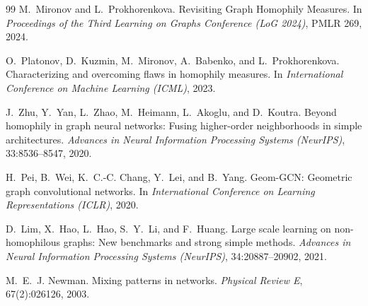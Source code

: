 \documentclass[11pt,a4paper]{article}
\begin{document}
\begin{thebibliography}{99}
M.~Mironov and L.~Prokhorenkova.
\newblock Revisiting Graph Homophily Measures.
\newblock In \emph{Proceedings of the Third Learning on Graphs Conference (LoG 2024)}, PMLR 269, 2024.

O.~Platonov, D.~Kuzmin, M.~Mironov, A.~Babenko, and L.~Prokhorenkova.
\newblock Characterizing and overcoming flaws in homophily measures.
\newblock In \emph{International Conference on Machine Learning (ICML)}, 2023.

J.~Zhu, Y.~Yan, L.~Zhao, M.~Heimann, L.~Akoglu, and D.~Koutra.
\newblock Beyond homophily in graph neural networks: Fusing higher-order neighborhoods in simple architectures.
\newblock \emph{Advances in Neural Information Processing Systems (NeurIPS)}, 33:8536--8547, 2020.

H.~Pei, B.~Wei, K.~C.-C. Chang, Y.~Lei, and B.~Yang.
\newblock Geom-GCN: Geometric graph convolutional networks.
\newblock In \emph{International Conference on Learning Representations (ICLR)}, 2020.

D.~Lim, X.~Hao, L.~Hao, S.~Y.~Li, and F.~Huang.
\newblock Large scale learning on non-homophilous graphs: New benchmarks and strong simple methods.
\newblock \emph{Advances in Neural Information Processing Systems (NeurIPS)}, 34:20887--20902, 2021.

M.~E.~J. Newman.
\newblock Mixing patterns in networks.
\newblock \emph{Physical Review E}, 67(2):026126, 2003.
\end{thebibliography}
\end{document}

